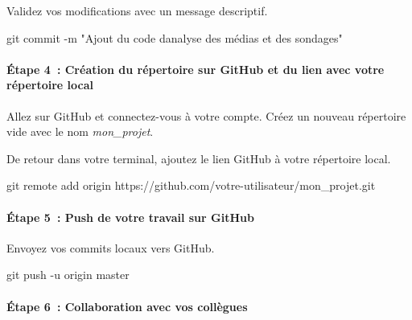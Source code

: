 \documentclass[
  letterpaper,
]{scrbook}
\let\oldparagraph\paragraph
\renewcommand{\paragraph}[1]{\oldparagraph{#1}\mbox{}}
\newenvironment{Shaded}{\begin{snugshade}}{\end{snugshade}}
\newcommand{\AttributeTok}[1]{\textcolor[rgb]{0.40,0.45,0.13}{#1}}
\newcommand{\FunctionTok}[1]{\textcolor[rgb]{0.28,0.35,0.67}{#1}}
\newcommand{\NormalTok}[1]{\textcolor[rgb]{0.00,0.23,0.31}{#1}}
\newcommand{\StringTok}[1]{\textcolor[rgb]{0.13,0.47,0.30}{#1}}
\begin{document}
Validez vos modifications avec un message descriptif.

\begin{Shaded}
\begin{Highlighting}[]
\FunctionTok{git}\NormalTok{ commit }\AttributeTok{{-}m} \StringTok{"Ajout du code d\textquotesingle{}analyse des médias et des sondages"}
\end{Highlighting}
\end{Shaded}

\hypertarget{uxe9tape-4-cruxe9ation-du-ruxe9pertoire-sur-github-et-du-lien-avec-votre-ruxe9pertoire-local}{%
\paragraph{Étape 4~: Création du répertoire sur GitHub et du lien avec
votre répertoire
local}\label{uxe9tape-4-cruxe9ation-du-ruxe9pertoire-sur-github-et-du-lien-avec-votre-ruxe9pertoire-local}}

Allez sur GitHub et connectez-vous à votre compte. Créez un nouveau
répertoire vide avec le nom \emph{mon\_projet}.

De retour dans votre terminal, ajoutez le lien GitHub à votre répertoire
local.

\begin{Shaded}
\begin{Highlighting}[]
\FunctionTok{git}\NormalTok{ remote add origin https://github.com/votre{-}utilisateur/mon\_projet.git}
\end{Highlighting}
\end{Shaded}

\hypertarget{uxe9tape-5-push-de-votre-travail-sur-github}{%
\paragraph{Étape 5~: Push de votre travail sur
GitHub}\label{uxe9tape-5-push-de-votre-travail-sur-github}}

Envoyez vos commits locaux vers GitHub.

\begin{Shaded}
\begin{Highlighting}[]
\FunctionTok{git}\NormalTok{ push }\AttributeTok{{-}u}\NormalTok{ origin master}
\end{Highlighting}
\end{Shaded}

\hypertarget{uxe9tape-6-collaboration-avec-vos-colluxe8gues}{%
\paragraph{Étape 6~: Collaboration avec vos
collègues}\label{uxe9tape-6-collaboration-avec-vos-colluxe8gues}}
\end{document}
